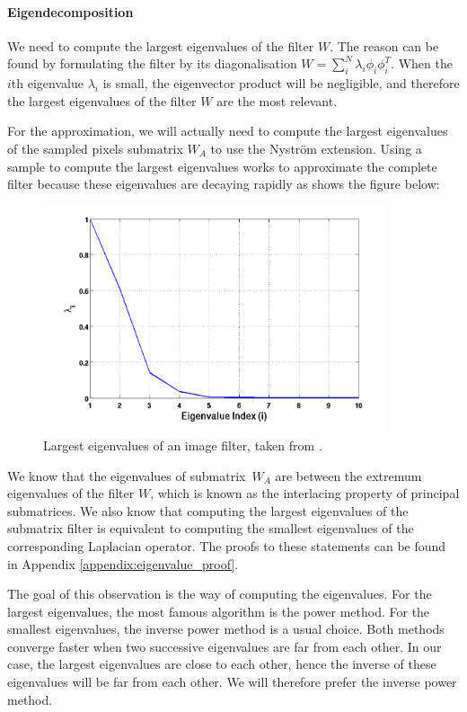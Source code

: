 \paragraph{Eigendecomposition}
We need to compute the largest eigenvalues of the filter \(W\).
The reason can be found by formulating the filter by its diagonalisation \(W = \sum_i^N \lambda_i \phi_i \phi_i^T\).
When the \(i\)th eigenvalue \(\lambda_i\) is small, the eigenvector product will be negligible, and therefore the largest eigenvalues of the filter \(W\) are the most relevant.

For the approximation, we will actually need to compute the largest eigenvalues of the sampled pixels submatrix \(W_A\) to use the Nystr\"om extension.
Using a sample to compute the largest eigenvalues works to approximate the complete filter because these eigenvalues are decaying rapidly as shows the figure below:
\begin{figure}[H]
  \centering
  \includegraphics[width=0.9\textwidth]{img/decayingEigenvalues.png}
  \caption{Largest eigenvalues of an image filter, taken from \cite{siam_slides_2016}.}
\end{figure}

We know that the eigenvalues of submatrix\ \(W_A\) are between the extremum eigenvalues of the filter \(W\), which is known as the interlacing property of principal submatrices.
We also know that computing the largest eigenvalues of the submatrix filter is equivalent to computing the smallest eigenvalues of the corresponding Laplacian operator.
The proofs to these statements can be found in Appendix \ref{appendix:eigenvalue_proof}.

The goal of this observation is the way of computing the eigenvalues.
For the largest eigenvalues, the most famous algorithm is the power method.
For the smallest eigenvalues, the inverse power method is a usual choice.
Both methods converge faster when two successive eigenvalues are far from each other.
In our case, the largest eigenvalues are close to each other, hence the inverse of these eigenvalues will be far from each other.
We will therefore prefer the inverse power method.

